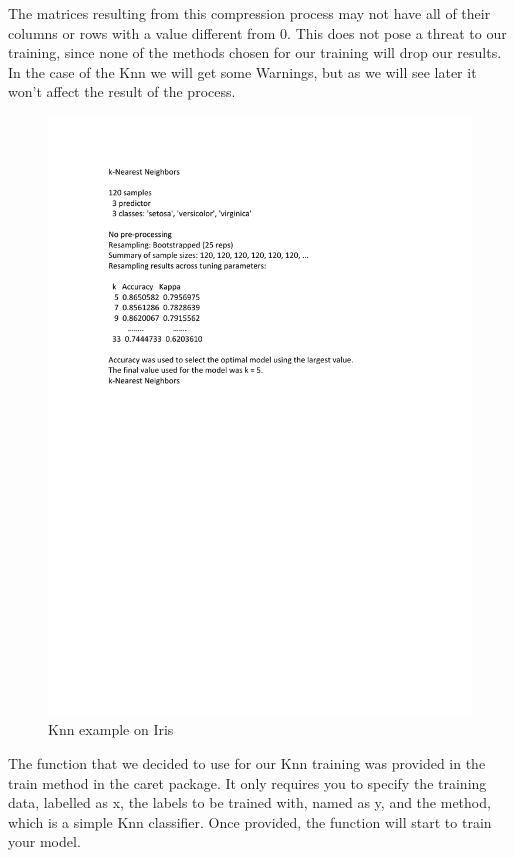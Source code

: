 The matrices resulting from this compression process may not have all of their columns or rows with a value different from 0. This does not pose a threat to our training, since none of the methods chosen for our training will drop our results. In the case of the Knn  we will get some Warnings, but as we will see later it won't affect the result of the process. \par


\begin{figure}[H]
	\centering
	\includegraphics[width=15cm]{Figuras_tfg/Knn_example}
	\caption{Knn example on Iris}
	\label{fig:figure_Knn_Iris}
\end{figure}

The function that we decided to use for our Knn training was provided in the train method in the caret package. It only requires you to specify the training data, labelled as x, the labels to be trained with, named as y, and the method, which is a simple Knn classifier. Once provided, the function will start to train your model. \par



